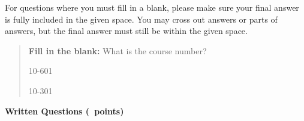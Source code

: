 \documentclass[11pt,addpoints,answers]{exam}
\begin{document}
For questions where you must fill in a blank, please make sure your final answer is fully included in the given space. You may cross out answers or parts of answers, but the final answer must still be within the given space.

\begin{quote}
\textbf{Fill in the blank:} What is the course number?

\begin{tcolorbox}[fit,height=1cm, width=4cm, blank, borderline={1pt}{-2pt},nobeforeafter]
    \begin{center}\huge10-601\end{center}
    \end{tcolorbox}\hspace{2cm}
    \begin{tcolorbox}[fit,height=1cm, width=4cm, blank, borderline={1pt}{-2pt},nobeforeafter]
    \begin{center}\huge10-301\end{center}
    \end{tcolorbox}
\end{quote}
    \clearpage
    
    {\LARGE \bf Written Questions (\numpoints \ points)}
    
\end{document}
